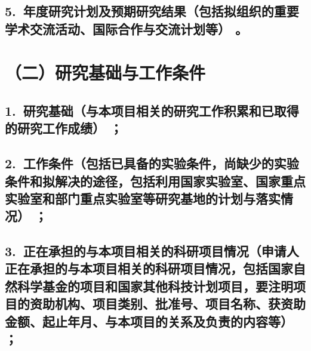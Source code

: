 \documentclass[12pt,UTF8,AutoFakeBold=2.5,a4paper]{ctexart} %
\begin{document}
{}


\subsection{\hspace{1.5em}  5.~{\bfseries 年度研究计划及预期研究结果}（包括拟组织的重要学术交流活动、国际合作与交流计划等）\hspace{-14pt} 。}

{}




\section{{\bfseries（二）研究基础与工作条件}} %
\subsection{\hspace{1.45em}  1.~{\bfseries 研究基础}（与本项目相关的研究工作积累和已取得的研究工作成绩）\hspace{-14pt} ；}


{}

\subsection{\hspace{1.45em}  2.~{\bfseries 工作条件}（包括已具备的实验条件，尚缺少的实验条件和拟解决的途径，包括利用国家实验室、国家重点实验室和部门重点实验室等研究基地的计划与落实情况）\hspace{-14pt}  ；}

{}

\subsection{\hspace{1.45em}  3.~{\bfseries 正在承担的与本项目相关的科研项目情况}（申请人正在承担的与本项目相关的科研项目情况，包括国家自然科学基金的项目和国家其他科技计划项目，要注明项目的资助机构、项目类别、批准号、项目名称、\hspace{-4pt}获资助金额、\hspace{-4pt}起止年月、\hspace{-4pt}与本项目的关系及负责的内容等）\hspace{-12.6pt} ；\hspace{-12.6pt} }
\end{document}

